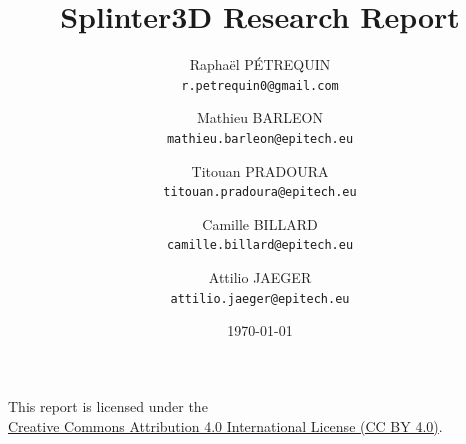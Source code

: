 \documentclass[12pt,a4paper]{article}
\title{Splinter3D Research Report}
\author{
    Raphaël PÉTREQUIN \\
    \texttt{r.petrequin0@gmail.com}
    \and
    Mathieu BARLEON \\
    \texttt{mathieu.barleon@epitech.eu}
    \and
    Titouan PRADOURA \\
    \texttt{titouan.pradoura@epitech.eu}
    \and
    Camille BILLARD \\
    \texttt{camille.billard@epitech.eu}
    \and
    Attilio JAEGER \\
    \texttt{attilio.jaeger@epitech.eu}
}
\date{\today}
\begin{document}
\maketitle

\begin{center}
    \small
    This report is licensed under the \\
    \href{https://creativecommons.org/licenses/by/4.0/}
    {Creative Commons Attribution 4.0 International License (CC BY 4.0)}.
\end{center}


\begin{abstract}
    
\end{abstract}


\newpage

\tableofcontents

\newpage











\printbibliography
\end{document}
